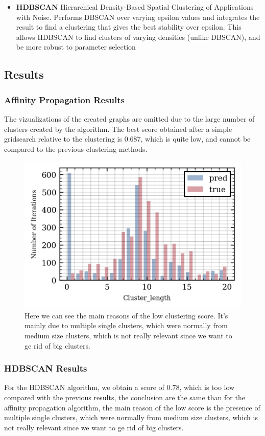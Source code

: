 \documentclass[11pt,a4paper]{report}
\begin{document}
\begin{multicols}{2}
\begin{itemize}
        \item \textbf{HDBSCAN}
              Hierarchical Density-Based Spatial Clustering of Applications with Noise. Performs DBSCAN over varying epsilon values and integrates the result to find a
              clustering that gives the best stability over epsilon. This allows HDBSCAN to find clusters of varying densities (unlike DBSCAN), and be more robust to parameter selection
    \end{itemize}
    \subsection{Results}
    \subsubsection{Affinity Propagation Results}
    The vizualizations of the created graphs are omitted due to the large number of clusters created by the algorithm. The best score obtained after a simple gridsearch relative to the clustering is 0.687, which is quite low, and cannot be compared to the previous clustering methods.
    \begin{figure}[H]
        \centering
        \includegraphics[width=0.98\linewidth]{./figure/cluster_length_ap.png}
        \caption{Here we can see the main reasons of the low clustering score. It's mainly due to multiple single clusters, which were normally from medium size clusters, which is not really relevant since we want to ge rid of big clusters.}
        \label{fig:}
    \end{figure}

    \subsubsection{HDBSCAN Results}
    For the HDBSCAN algorithm, we obtain a score of 0.78, which is too low compared with the previous results, the conclusion are the same than for the affinity propagation algorithm, the main reason of the low score is the presence of multiple single clusters, which were normally from medium size clusters, which is not really relevant since we want to ge rid of big clusters.

\end{multicols}
\end{document}
